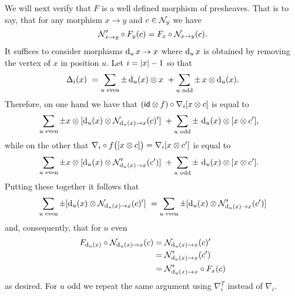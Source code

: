We will next verify that $F$ is a well defined morphism of presheaves.
That is to say, that for any morphism $x \to y$ and $c \in \mathcal{N}_y$ we have
\[
\mathcal{N}'_{x \to y} \circ F_y(c) = F_x \circ \mathcal{N}_{x \to y}(c).
\]
It suffices to consider morphisms $\operatorname{d}_u x \to x$ where $\operatorname{d}_u x$ is obtained by removing the vertex of $x$ in position $u$.
Let $i = \lvert x\rvert-1$ so that
\[
\operatorname{\Delta}_i(x) \ =
\sum_{u \text{ even}} \pm \operatorname{d}_u(x) \otimes x \ +
\sum_{u \text{ odd}} \pm \, x \otimes \operatorname{d}_u(x).
\]
Therefore, on one hand we have that $(\mathsf{id} \otimes f) \circ \nabla_i [x \otimes c]$ is equal to
\begin{align*}
	&\sum_{u \text{ even}} \pm x \otimes [\operatorname{d}_u(x) \otimes \mathcal{N}_{\operatorname{d}_u(x) \to x}(c)'] \ +
	\sum_{u \text{ odd}} \pm \, \operatorname{d}_u(x) \otimes [x \otimes c'],
\end{align*}
while on the other that $\nabla_i \circ f \big( [x \otimes c] \big) = \nabla_i [x \otimes c']$ is equal to
\begin{align*}
	&\sum_{u \text{ even}} \pm x \otimes [\operatorname{d}_u(x) \otimes \mathcal{N}'_{\operatorname{d}_u(x) \to x}(c')] \ +
	\sum_{u \text{ odd}} \pm \, \operatorname{d}_u(x) \otimes [x \otimes c'].
\end{align*}
Putting these together it follows that
\[
	\sum_{u \text{ even}} \pm [\operatorname{d}_u(x) \otimes \mathcal{N}_{\operatorname{d}_u(x) \to x}(c)'] \ =
	\sum_{u \text{ even}} \pm [\operatorname{d}_u(x) \otimes \mathcal{N}'_{\operatorname{d}_u(x) \to x}(c')]
\]
and, consequently, that for $u$ even
\begin{align*}
	F_{\operatorname{d}_u(x)} \circ \mathcal{N}_{\operatorname{d}_u(x) \to x}(c) &=
	\mathcal{N}_{\operatorname{d}_u(x) \to x}(c)' \\ &=
	\mathcal{N}'_{\operatorname{d}_u(x) \to x}(c') \\ &=
	\mathcal{N}'_{\operatorname{d}_u(x) \to x} \circ F_{x}(c)
\end{align*}
as desired.
For $u$ odd we repeat the same argument using $\nabla_i^T$ instead of $\nabla_i$.
